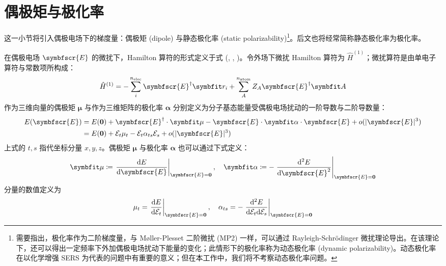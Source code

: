 \section{偶极矩与极化率}
\label{sec.3.dipole-polar}

这一小节将引入偶极电场下的梯度量：偶极矩 (dipole) 与静态极化率 (static polarizability)\footnote{需要指出，极化率作为二阶梯度量，与 M\o{}ller-Plesset 二阶微扰 (MP2) 一样，可以通过 Rayleigh-Schr\"odinger 微扰理论导出。在该理论下，还可以得出一定频率下外加偶极电场扰动下能量的变化；此情形下的极化率称为动态极化率 (dynamic polarizability)。动态极化率在以化学增强 SERS 为代表的问题中有重要的意义\cite{Jensen-Schatz.CSR.2008, Perez-Jimenez-Ren.CS.2020, Li-Xu.C.2022}；但在本工作中，我们将不考察动态极化率问题。}。后文也将经常简称静态极化率为极化率。

在偶极电场 $\symbfscr{E}$ 的微扰下，Hamilton 算符的形式定义于式 (, , )。令外场下微扰 Hamilton 算符为 $\hat H^{(1)}$；微扰算符是由单电子算符与常数项所构成：
\begin{equation}
    \label{eq.3.electric-perturbed-hamiltonian}
    \hat H^{(1)} = - \sum_i^{n_\mathrm{elec}} \symbfscr{E}^\dagger \bm{r}_i + \sum_{A}^{n_\mathrm{atom}} Z_A \symbfscr{E}^\dagger \bm{A}
\end{equation}
作为三维向量的偶极矩 $\bm{\mu}$ 与作为三维矩阵的极化率 $\bm{\alpha}$ 分别定义为分子基态能量受偶极电场扰动的一阶导数与二阶导数量\cite{Atkins-Friedman.Oxford.2011}：
\begin{align}
    E(\symbfscr{E}) &= E(\mathbf{0}) + \symbfscr{E}^\dagger \cdot \bm{\mu} - \symbfscr{E} \cdot \bm{\alpha} \cdot \symbfscr{E} + o(|\symbfscr{E}|^3) \notag\\
    &= E(\mathbf{0}) + \mathcal{E}_t \mu_t - \mathcal{E}_t \alpha_{ts} \mathcal{E}_s + o(|\symbfscr{E}|^3)
\end{align}
上式的 $t, s$ 指代坐标分量 $x, y, z$。偶极矩 $\bm{\mu}$ 与极化率 $\bm{\alpha}$ 也可以通过下式定义：
\begin{equation}
    \bm{\mu} \coloneq \left. \frac{\mathrm{d} E}{\mathrm{d} \symbfscr{E}} \right|_{\symbfscr{E} = \mathbf{0}}, \quad
    \bm{\alpha} \coloneq - \left. \frac{\mathrm{d}^2 E}{\mathrm{d} \symbfscr{E}^2} \right|_{\symbfscr{E} = \mathbf{0}}
\end{equation}
分量的数值定义为
\begin{equation}
    \mu_t = \left. \frac{\mathrm{d} E}{\mathrm{d} \mathcal{E}_t} \right|_{\symbfscr{E} = \mathbf{0}}, \quad
    \alpha_{ts} = - \left. \frac{\mathrm{d}^2 E}{\mathrm{d} \mathcal{E}_t \mathrm{d} \mathcal{E}_s} \right|_{\symbfscr{E} = \mathbf{0}}
\end{equation}

